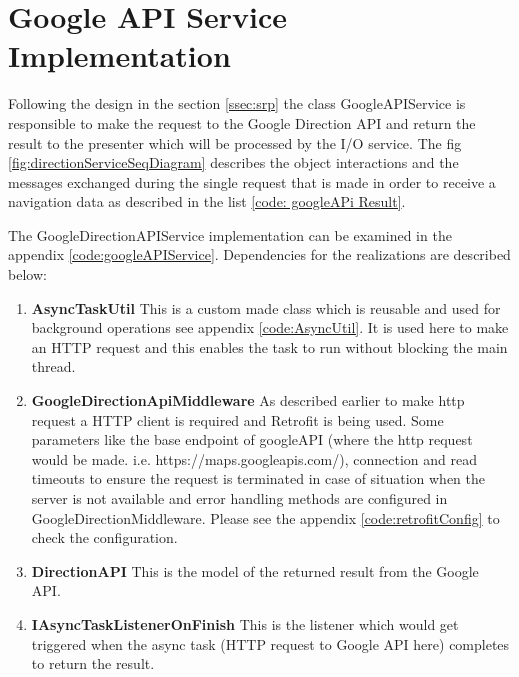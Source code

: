 
\section{Google API Service Implementation}
    Following the design in the section \ref{ssec:srp} the class 
    GoogleAPIService is responsible to make the request to the Google
    Direction API and return the result to the presenter which will be
    processed by the I/O service. The fig \ref{fig:directionServiceSeqDiagram}
    describes the object interactions and the messages exchanged during the
    single request that is made in order to receive a navigation data as described in
    the list \ref{code: googleAPi Result}.
    
    \par
        The GoogleDirectionAPIService implementation can be examined in
        the appendix \ref{code:googleAPIService}.
        Dependencies for the realizations are described below:
        \begin{enumerate}
            \item  
                \textbf{AsyncTaskUtil}
                    This is a custom made class which is reusable and used for background
                    operations see appendix \ref{code:AsyncUtil}. It is used here to make an HTTP request and this enables
                    the task to run without blocking the main thread. 
            \item  
                \textbf{GoogleDirectionApiMiddleware}
                As described earlier to make http request a HTTP client 
                is required and Retrofit
                is being used. Some parameters like the base endpoint of googleAPI 
                (where the http
                request would be made. i.e. https://maps.googleapis.com/), 
                connection and read timeouts
                to ensure the request is terminated 
                in case of situation when the server is not available 
                and error handling methods are configured in 
                GoogleDirectionMiddleware. Please see the appendix 
                \ref{code:retrofitConfig} to check the configuration. 
            \item  
                \textbf{DirectionAPI}
                    This is the model of the returned result from the Google
                    API.
            \item  
                \textbf{IAsyncTaskListenerOnFinish}
                    This is the listener which would get triggered when the
                    async task (HTTP request to Google API here) completes to
                    return the result.
        \end{enumerate}       
        



    